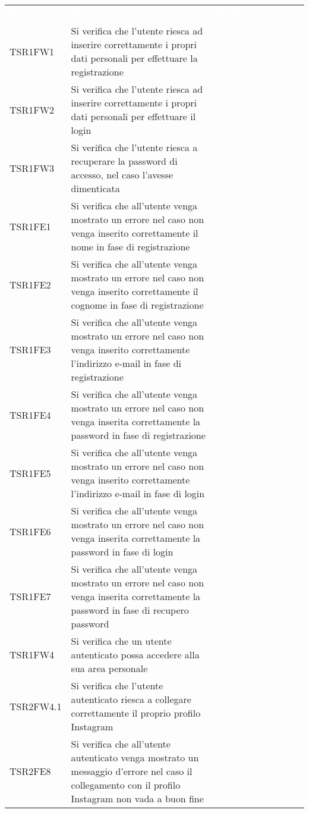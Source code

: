 \renewcommand{\arraystretch}{1.5}
\begin{longtable}{ m{}<{\centering}  m{}<{\centering}  m{}<{\centering} }
	\rowcolor{darkblue}
	\textcolor{white}{\textbf{Test}} &\textcolor{white}{\textbf{Descrizione}} & \textcolor{white}{\textbf{Implementazione}} \\ 

	TSR1FW1 & Si verifica che l'utente riesca ad inserire correttamente i propri dati personali per effettuare la registrazione & \Ni \\
	TSR1FW2 & Si verifica che l'utente riesca ad inserire correttamente i propri dati personali per effettuare il login & \Ni \\
	TSR1FW3 & Si verifica che l'utente riesca a recuperare la password di accesso, nel caso l'avesse dimenticata & \Ni \\
	TSR1FE1 & Si verifica che all'utente venga mostrato un errore nel caso non venga inserito correttamente il nome in fase di registrazione & \Ni \\
	TSR1FE2 & Si verifica che all'utente venga mostrato un errore nel caso non venga inserito correttamente il cognome in fase di registrazione & \Ni \\
	TSR1FE3 & Si verifica che all'utente venga mostrato un errore nel caso non venga inserito correttamente l'indirizzo e-mail in fase di registrazione & \Ni \\
	TSR1FE4 & Si verifica che all'utente venga mostrato un errore nel caso non venga inserita correttamente la password in fase di registrazione & \Ni \\
	TSR1FE5 & Si verifica che all'utente venga mostrato un errore nel caso non venga inserito correttamente l'indirizzo e-mail in fase di login & \Ni \\
	TSR1FE6 & Si verifica che all'utente venga mostrato un errore nel caso non venga inserita correttamente la password in fase di login & \Ni \\
	TSR1FE7 & Si verifica che all'utente venga mostrato un errore nel caso non venga inserita correttamente la password in fase di recupero password & \Ni \\
	TSR1FW4 & Si verifica che un utente autenticato possa accedere alla sua area personale & \Ni \\
	TSR2FW4.1 & Si verifica che l'utente autenticato riesca a collegare correttamente il proprio profilo Instagram & \Ni \\
	TSR2FE8 & Si verifica che all'utente autenticato venga mostrato un messaggio d'errore nel caso il collegamento con il profilo Instagram non vada a buon fine & \Ni \\

\end{longtable}
